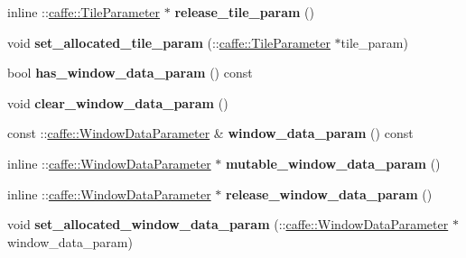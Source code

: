 \begin{DoxyCompactItemize}
\mbox{\label{classcaffe_1_1_layer_parameter_af4faab17e5421190951d372a4058dee4}} 
inline \+::\mbox{\hyperlink{classcaffe_1_1_tile_parameter}{caffe\+::\+Tile\+Parameter}} $\ast$ {\bfseries release\+\_\+tile\+\_\+param} ()
\item 
\mbox{\label{classcaffe_1_1_layer_parameter_a005767f7059d3a9a653741fdab34caec}} 
void {\bfseries set\+\_\+allocated\+\_\+tile\+\_\+param} (\+::\mbox{\hyperlink{classcaffe_1_1_tile_parameter}{caffe\+::\+Tile\+Parameter}} $\ast$tile\+\_\+param)
\item 
\mbox{\label{classcaffe_1_1_layer_parameter_a48a4930f18346ae97b59273cb4ce117f}} 
bool {\bfseries has\+\_\+window\+\_\+data\+\_\+param} () const
\item 
\mbox{\label{classcaffe_1_1_layer_parameter_ab0b57b28ad899d3dc8ac07644d188500}} 
void {\bfseries clear\+\_\+window\+\_\+data\+\_\+param} ()
\item 
\mbox{\label{classcaffe_1_1_layer_parameter_ad93172eb6be3d354ade401b8b4583705}} 
const \+::\mbox{\hyperlink{classcaffe_1_1_window_data_parameter}{caffe\+::\+Window\+Data\+Parameter}} \& {\bfseries window\+\_\+data\+\_\+param} () const
\item 
\mbox{\label{classcaffe_1_1_layer_parameter_a7940c2f1bb563f86589ba4f8cd373f0f}} 
inline \+::\mbox{\hyperlink{classcaffe_1_1_window_data_parameter}{caffe\+::\+Window\+Data\+Parameter}} $\ast$ {\bfseries mutable\+\_\+window\+\_\+data\+\_\+param} ()
\item 
\mbox{\label{classcaffe_1_1_layer_parameter_a5fac5abefaeccb9721543c03def79c65}} 
inline \+::\mbox{\hyperlink{classcaffe_1_1_window_data_parameter}{caffe\+::\+Window\+Data\+Parameter}} $\ast$ {\bfseries release\+\_\+window\+\_\+data\+\_\+param} ()
\item 
\mbox{\label{classcaffe_1_1_layer_parameter_a40c89907080b5310a11c059e67c9bfc9}} 
void {\bfseries set\+\_\+allocated\+\_\+window\+\_\+data\+\_\+param} (\+::\mbox{\hyperlink{classcaffe_1_1_window_data_parameter}{caffe\+::\+Window\+Data\+Parameter}} $\ast$window\+\_\+data\+\_\+param)
\end{DoxyCompactItemize}
